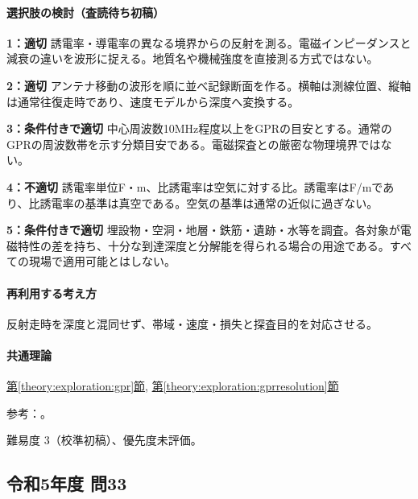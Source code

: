 \paragraph{選択肢の検討（査読待ち初稿）}\mbox{}\par

\noindent\textbf{1：適切} 誘電率・導電率の異なる境界からの反射を測る。電磁インピーダンスと減衰の違いを波形に捉える。地質名や機械強度を直接測る方式ではない。\par

\noindent\textbf{2：適切} アンテナ移動の波形を順に並べ記録断面を作る。横軸は測線位置、縦軸は通常往復走時であり、速度モデルから深度へ変換する。\par

\noindent\textbf{3：条件付きで適切} 中心周波数10MHz程度以上をGPRの目安とする。通常のGPRの周波数帯を示す分類目安である。電磁探査との厳密な物理境界ではない。\par

\noindent\textbf{4：不適切} 誘電率単位F・m、比誘電率は空気に対する比。誘電率はF/mであり、比誘電率の基準は真空である。空気の基準は通常の近似に過ぎない。\par

\noindent\textbf{5：条件付きで適切} 埋設物・空洞・地層・鉄筋・遺跡・水等を調査。各対象が電磁特性の差を持ち、十分な到達深度と分解能を得られる場合の用途である。すべての現場で適用可能とはしない。\par

\paragraph{再利用する考え方} 反射走時を深度と混同せず、帯域・速度・損失と探査目的を対応させる。

\paragraph{共通理論} \hyperref[theory:exploration:gpr]{第\ref*{theory:exploration:gpr}節}, \hyperref[theory:exploration:gprresolution]{第\ref*{theory:exploration:gprresolution}節}

\par 参考：\cite{epa_gpr}。

\par 難易度 3（校準初稿）、優先度未評価。

\subsection{令和5年度 問33}
\label{q:r05-reg-applied-33}

